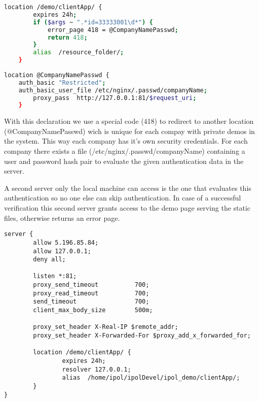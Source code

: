 \begin{lstlisting}[language=Bash]
location /demo/clientApp/ {
        expires 24h;
        if ($args ~ ".*id=33333001\d*") {
            error_page 418 = @CompanyNamePasswd;
            return 418;
        }
        alias  /resource_folder/;
    }
    
location @CompanyNamePasswd {
	auth_basic "Restricted";
	auth_basic_user_file /etc/nginx/.passwd/companyName;
        proxy_pass  http://127.0.0.1:81/$request_uri;
    }
 \end{lstlisting}

With this declaration we use a special code (418) to redirect to another location (@CompanyNamePasswd) wich is unique for each 
compay with private demos in the system. This way each company has it's own security credentials. For each company there exists a file
(/etc/nginx/.passwd/companyName) containing a user and password hash pair to evaluate the given authentication data in the server.

A second server only the local machine can access is the one that evaluates this authentication so no one else can skip authentication.
In case of a successful verification this second server grants access to the demo page serving the static files, otherwise returns an
error page.

\begin{lstlisting}
server {
        allow 5.196.85.84;
        allow 127.0.0.1;
        deny all;

        listen *:81;
        proxy_send_timeout          700;
        proxy_read_timeout          700;
        send_timeout                700;
        client_max_body_size        500m;

        proxy_set_header X-Real-IP $remote_addr;
        proxy_set_header X-Forwarded-For $proxy_add_x_forwarded_for;

        location /demo/clientApp/ {
                expires 24h;
                resolver 127.0.0.1;
                alias  /home/ipol/ipolDevel/ipol_demo/clientApp/;
        }
}
\end{lstlisting}